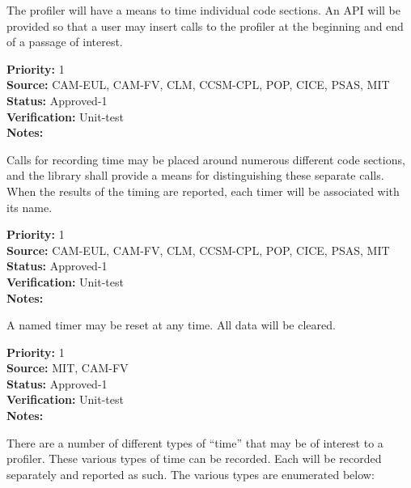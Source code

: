 

The profiler will have a means to time individual code sections.  An API will be 
provided so that a user may insert calls to the profiler at the beginning and
end of a passage of interest.

\begin{reqlist}
{\bf Priority:} 1 \\
{\bf Source:} CAM-EUL, CAM-FV, CLM, CCSM-CPL, POP, CICE, PSAS, MIT \\
{\bf Status:} Approved-1 \\
{\bf Verification:} Unit-test \\
{\bf Notes:} 
\end{reqlist}


Calls for recording time may be placed around numerous different code sections, 
and the library shall provide a means for distinguishing these separate calls.  When
the results of the timing are reported, each timer will be associated with its name.

\begin{reqlist}
{\bf Priority:} 1 \\
{\bf Source:} CAM-EUL, CAM-FV, CLM, CCSM-CPL, POP, CICE, PSAS, MIT \\
{\bf Status:} Approved-1 \\
{\bf Verification:} Unit-test \\
{\bf Notes:} 
\end{reqlist}


A named timer may be reset at any time.  All data will be cleared.

\begin{reqlist}
{\bf Priority:} 1 \\
{\bf Source:} MIT, CAM-FV \\
{\bf Status:} Approved-1 \\
{\bf Verification:} Unit-test \\
{\bf Notes:} 
\end{reqlist}


There are
a number of different types of ``time'' that may be of interest to a profiler.
These various types of time can be recorded.  Each will be recorded separately and reported
as such.  The various types are enumerated below:

